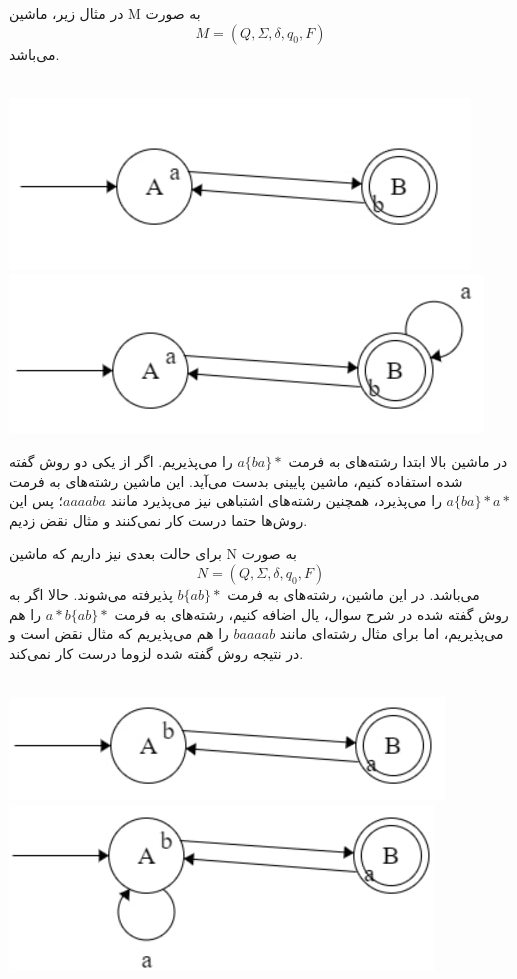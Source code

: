 در مثال زیر، ماشین M به صورت 
$$M = (Q, \Sigma, \delta, q_0, F)$$
می‌باشد.
\\
\\
\begin{center}
	\includegraphics{DFA1}
	\includegraphics{DFA2}
\end{center}
در ماشین بالا ابتدا رشته‌های به فرمت
$a\{ba\}*$
را می‌پذیریم. اگر از یکی دو روش گفته شده استفاده کنیم، ماشین پایینی بدست می‌آید. این ماشین رشته‌های به فرمت
$a\{ba\}*a*$
را می‌پذیرد، همچنین رشته‌های اشتباهی نیز می‌پذیرد مانند $aaaaba$؛ پس این روش‌ها حتما درست کار نمی‌کنند و مثال نقض زدیم.

برای حالت بعدی نیز داریم که ماشین N به صورت 
$$N = (Q, \Sigma, \delta, q_0, F)$$
می‌باشد.
در این ماشین، رشته‌های به فرمت $b\{ab\}*$ پذیرفته می‌شوند. حالا اگر به روش گفته شده در شرح سوال، یال اضافه کنیم، رشته‌های به فرمت 
$a*b\{ab\}*$
را هم می‌پذیریم، اما برای مثال رشته‌ای مانند $baaaab$ را هم می‌پذیریم که مثال نقض است و در نتیجه روش گفته شده لزوما درست کار نمی‌کند.
\\
\\
\begin{center}
\includegraphics{DFA4}
\includegraphics{DFA3}
\end{center}

